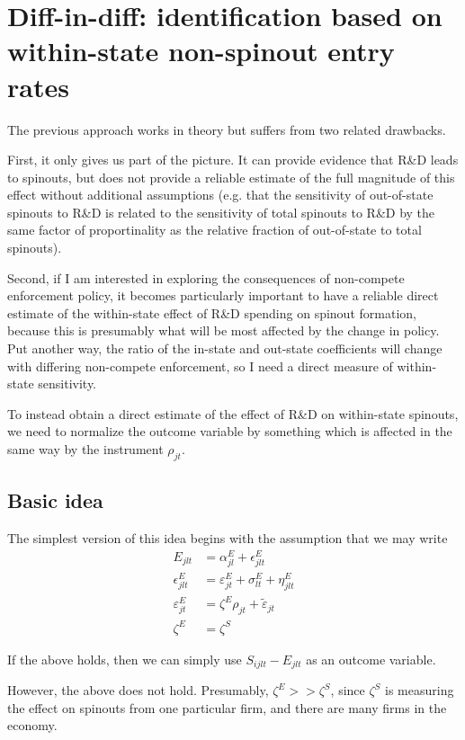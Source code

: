 \documentclass[11pt,english]{article}
\theoremstyle{remark}
\begin{document}
\section{Diff-in-diff: identification based on within-state non-spinout entry rates}

The previous approach works in theory but suffers from two related drawbacks. 

First, it only gives us part of the picture. It can provide evidence that R\&D leads to spinouts, but does not provide a reliable estimate of the full magnitude of this effect without additional assumptions (e.g. that the sensitivity of out-of-state spinouts to R\&D is related to the sensitivity of total spinouts to R\&D by the same factor of proportinality as the relative fraction of out-of-state to total spinouts).

Second, if I am interested in exploring the consequences of non-compete enforcement policy, it becomes particularly important to have a reliable direct estimate of the within-state effect of R\&D spending on spinout formation, because this is presumably what will be most affected by the change in policy. Put another way, the ratio of the in-state and out-state coefficients will change with differing non-compete enforcement, so I need a direct measure of within-state sensitivity.

To instead obtain a direct estimate of the effect of R\&D on within-state spinouts, we need to normalize the outcome variable by something which is affected in the same way by the instrument $\rho_{jt}$. 

\subsection{Basic idea} 
The simplest version of this idea begins with the assumption that we may write 
\begin{align*}
	E_{jlt} &= \alpha_{jl}^E + \epsilon^E_{jlt} \\
	\epsilon^E_{jlt} &= \varepsilon^E_{jt} + \sigma^E_{lt} + \eta_{jlt}^E \\
	\varepsilon^E_{jt} &= \zeta^E \rho_{jt} + \tilde{\varepsilon}_{jt} \\
	\zeta^E &= \zeta^S
\end{align*}

If the above holds, then we can simply use $S_{ijlt} - E_{jlt}$ as an outcome variable. 

However, the above does not hold. Presumably, $\zeta^E >> \zeta^S$, since $\zeta^S$ is measuring the effect on spinouts from one particular firm, and there are many firms in the economy. 
\end{document}
